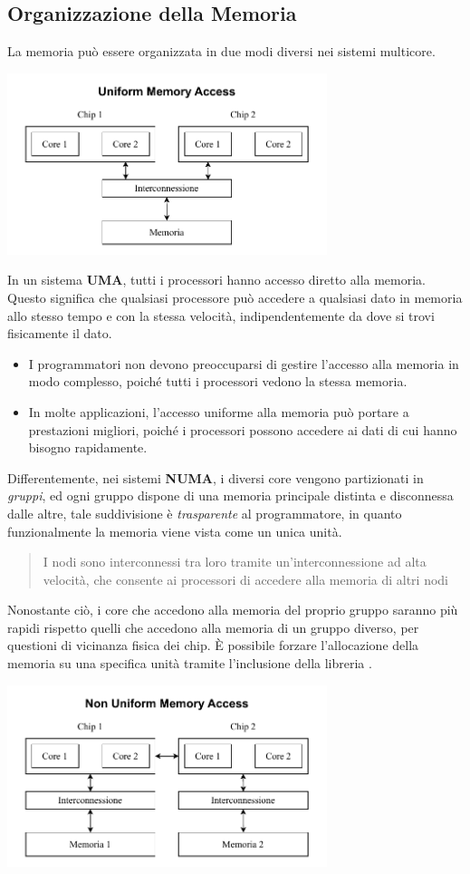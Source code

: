 \documentclass[10pt, letterpaper]{report}
\begin{document}
\subsection{Organizzazione della Memoria}
La memoria può essere organizzata in due modi diversi nei sistemi multicore.\begin{center}
    \includegraphics[width=0.7\textwidth ]{images/UMA.pdf}
\end{center}
In un sistema \textbf{UMA}, tutti i processori hanno accesso diretto alla memoria. Questo significa che qualsiasi processore può accedere a qualsiasi dato in memoria allo stesso tempo e con la stessa velocità, indipendentemente da dove si trovi fisicamente il dato.\begin{itemize}
    \item  I programmatori non devono preoccuparsi di gestire l'accesso alla memoria in modo complesso, poiché tutti i processori vedono la stessa memoria. 
    \item In molte applicazioni, l'accesso uniforme alla memoria può portare a prestazioni migliori, poiché i processori possono accedere ai dati di cui hanno bisogno rapidamente.
\end{itemize}
Differentemente, nei sistemi \textbf{NUMA}, i diversi core vengono partizionati in \textit{gruppi}, ed ogni gruppo dispone di una memoria principale distinta e disconnessa dalle altre, tale suddivisione è \textit{trasparente} al programmatore, in quanto funzionalmente la memoria viene vista come un unica unità.\begin{quote}
    I nodi sono interconnessi tra loro tramite un'interconnessione ad alta velocità, che consente ai processori di accedere alla memoria di altri nodi
\end{quote} Nonostante ciò, i core che accedono alla memoria del proprio gruppo saranno più rapidi rispetto quelli che accedono alla memoria di un gruppo diverso, per questioni di vicinanza fisica dei chip.\acc 
È possibile forzare l'allocazione della memoria su una specifica unità tramite l'inclusione della libreria .\begin{center}
    \includegraphics[width=0.7\textwidth ]{images/NUMA.pdf}
\end{center}
\end{document}
